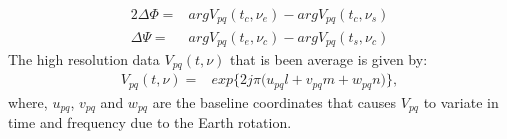 \begin{alignat}{2}
\Delta \Phi=&arg V_{pq}(t_{c},\nu_{e})-arg V_{pq}(t_{c},\nu_{s})\\
\Delta \Psi=&arg V_{pq}(t_{e},\nu_{c})-arg V_{pq}(t_{s},\nu_{c})
\end{alignat}
The high resolution data $V_{pq}(t,\nu)$ that is been average is given by:
\begin{eqnarray}
 V_{pq}(t, \nu)=& exp\bigg\{2j\pi\big(u_{pq}l+v_{pq}m+ w_{pq}n\big)\bigg\}\label{eq233},
\end{eqnarray}
where, $u_{pq}$, $v_{pq}$ and $w_{pq}$ are the baseline coordinates that causes $V_{pq}$ to variate in time and frequency due to the Earth 
rotation.\\
% 
